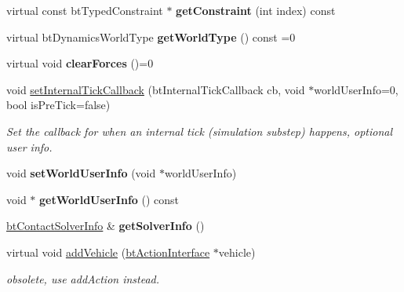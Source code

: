 \begin{DoxyCompactItemize}
\mbox{\label{classbtDynamicsWorld_a2d54fd1821af1a614d431863807dee7e}} 
virtual const bt\+Typed\+Constraint $\ast$ {\bfseries get\+Constraint} (int index) const
\item 
\mbox{\label{classbtDynamicsWorld_a7c657a2757b38c533dd6b3a7110624e1}} 
virtual bt\+Dynamics\+World\+Type {\bfseries get\+World\+Type} () const =0
\item 
\mbox{\label{classbtDynamicsWorld_a9a9d474cc43c25095cd32e1c3332152a}} 
virtual void {\bfseries clear\+Forces} ()=0
\item 
\mbox{\label{classbtDynamicsWorld_a6974c869e196322377e2d8c078db5805}} 
void \hyperlink{classbtDynamicsWorld_a6974c869e196322377e2d8c078db5805}{set\+Internal\+Tick\+Callback} (bt\+Internal\+Tick\+Callback cb, void $\ast$world\+User\+Info=0, bool is\+Pre\+Tick=false)
\begin{DoxyCompactList}\small\item\em Set the callback for when an internal tick (simulation substep) happens, optional user info. \end{DoxyCompactList}\item 
\mbox{\label{classbtDynamicsWorld_ad1f3418fce3381a0fbd4419cc701a97d}} 
void {\bfseries set\+World\+User\+Info} (void $\ast$world\+User\+Info)
\item 
\mbox{\label{classbtDynamicsWorld_aeb8cd7e7b8aa9eb61948069fc173e378}} 
void $\ast$ {\bfseries get\+World\+User\+Info} () const
\item 
\mbox{\label{classbtDynamicsWorld_ae8004bb6113c17b9cd1eca5ade1c2aba}} 
\hyperlink{structbtContactSolverInfo}{bt\+Contact\+Solver\+Info} \& {\bfseries get\+Solver\+Info} ()
\item 
\mbox{\label{classbtDynamicsWorld_ab897455739081304249e7af787cafa19}} 
virtual void \hyperlink{classbtDynamicsWorld_ab897455739081304249e7af787cafa19}{add\+Vehicle} (\hyperlink{classbtActionInterface}{bt\+Action\+Interface} $\ast$vehicle)
\begin{DoxyCompactList}\small\item\em obsolete, use add\+Action instead. \end{DoxyCompactList}\item 

\end{DoxyCompactItemize}
